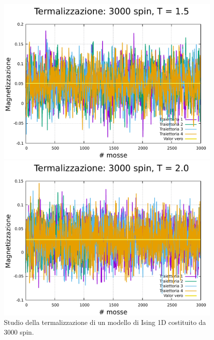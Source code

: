 \begin{figure}[htbp]
    \begin{minipage}{0.45\textwidth}  
      \centering
      \includegraphics[page=1, width=\textwidth]{Immagini/simIsing1D/magn0.02/term/term_3000_1.5.pdf}
      \caption{$T\,=\,1.5$}
    \end{minipage}\hfill
    \begin{minipage}{0.45\textwidth}  
      \centering
      \includegraphics[page=1, width=\textwidth]{Immagini/simIsing1D/magn0.02/term/term_3000_2.0.pdf}
      \caption{$T\,=\,2.0$}
    \end{minipage}
    \caption{Studio della termalizzazione di un modello di Ising 1D costituito da 3000 spin.}
\end{figure}

